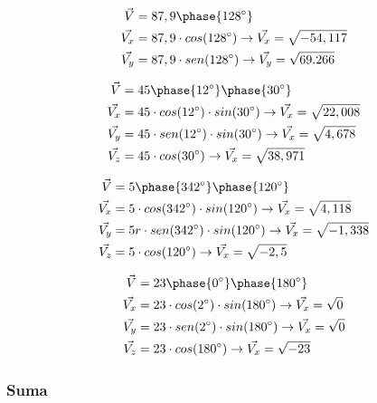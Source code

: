     \begin{align*}
        \vec{V}&=87,9 \phase{128^\circ}  \\
        \vec{V_x}&= 87,9\cdot cos(128^\circ) \rightarrow \vec{V_x} = \sqrt{-54,117} \\
        \vec{V_y}& =  87,9\cdot sen(128^\circ)  \rightarrow \vec{V_y}= \sqrt{69.266} \\
    \end{align*}


    \begin{align*}
        \vec{V}&=45 \phase{12^\circ}\phase{30^\circ} \\
        \vec{V_x}&= 45\cdot cos(12^\circ) \cdot sin(30^\circ)  \rightarrow \vec{V_x} = \sqrt{22,008} \\
        \vec{V_y} &= 45\cdot sen(12^\circ)\cdot sin(30^\circ) \rightarrow \vec{V_x} = \sqrt{4,678} \\
        \vec{V_z}&=45\cdot cos(30^\circ)  \rightarrow \vec{V_x}= \sqrt{38,971} \\
    \end{align*}

    \begin{align*}
        \vec{V}&=5 \phase{342^\circ}\phase{120^\circ}\\
        \vec{V_x}&= 5\cdot cos(342^\circ) \cdot sin(120^\circ)   \rightarrow \vec{V_x} = \sqrt{4,118} \\
        \vec{V_y} &=5r\cdot sen(342^\circ)\cdot sin(120^\circ)  \rightarrow \vec{V_x} = \sqrt{-1,338} \\
        \vec{V_z}&=5\cdot cos(120^\circ)  \rightarrow \vec{V_x} = \sqrt{-2,5} \\
    \end{align*}

    \begin{align*}
        \vec{V}&=23 \phase{0^\circ}\phase{180^\circ}\\
        \vec{V_x}&= 23\cdot cos(2^\circ) \cdot sin(180^\circ)   \rightarrow \vec{V_x} = \sqrt{0} \\
        \vec{V_y} &= 23\cdot sen(2^\circ)\cdot sin(180^\circ)  \rightarrow \vec{V_x} = \sqrt{0} \\
        \vec{V_z}&= 23\cdot cos(180^\circ)  \rightarrow \vec{V_x} = \sqrt{-23} \\
    \end{align*}


    \subsubsection{Suma}

